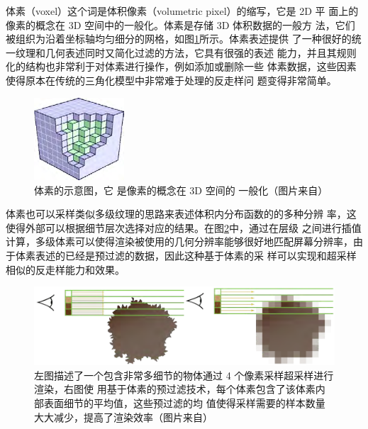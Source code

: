体素（voxel）这个词是体积像素（volumetric pixel）的缩写，它是 2D 平 面上的像素的概念在 3D 空间中的一般化。体素是存储 3D 体积数据的一般方 法，它们被组织为沿着坐标轴均匀细分的网格，如图\ref{f:vct-4-2}所示。体素表述提供 了一种很好的统一纹理和几何表述同时又简化过滤的方法，它具有很强的表述 能力，并且其规则化的结构也非常利于对体素进行操作，例如添加或删除一些 体素数据，这些因素使得原本在传统的三角化模型中非常难于处理的反走样问 题变得非常简单。

\begin{figure}
\sidecaption
	\includegraphics[width=0.3\textwidth]{figures/vct/vct-4-2}
	\caption{体素的示意图，它 是像素的概念在 3D 空间的 一般化（图片来自\cite{a:InteractiveIndirectIlluminationUsingVoxelConeTracing}）}
	\label{f:vct-4-2}
\end{figure}

体素也可以采样类似多级纹理的思路来表述体积内分布函数的的多种分辨 率，这使得外部可以根据细节层次选择对应的结果。在图\ref{f:vct-4-3}中，通过在层级 之间进行插值计算，多级体素可以使得渲染被使用的几何分辨率能够很好地匹配屏幕分辨率，由于体素表述的已经是预过滤的数据，因此这种基于体素的采 样可以实现和超采样相似的反走样能力和效果。

\begin{figure}
	\includegraphics[width=\textwidth]{figures/vct/vct-4-3}
	\caption{左图描述了一个包含非常多细节的物体通过 4 个像素采样超采样进行渲染，右图使 用基于体素的预过滤技术，每个体素包含了该体素内部表面细节的平均值，这些预过滤的均 值使得采样需要的样本数量大大减少，提高了渲染效率（图片来自\cite{a:InteractiveIndirectIlluminationUsingVoxelConeTracing}）}
	\label{f:vct-4-3}
\end{figure}



